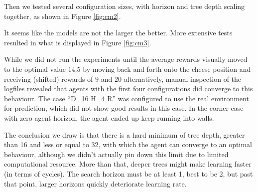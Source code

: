 \documentclass{article}
\begin{document}
\begin{flushleft}
\begin{figure}
\end{figure}

\newpage

Then we tested several configuration sizes, with 
horizon and tree depth scaling together, 
as shown in Figure \ref{fig:cm2}.

\begin{figure}
\end{figure}

It seems like the models are not the larger
the better. More extensive tests resulted
in what is displayed in Figure \ref{fig:cm3}.

While we did not run the experiments until the
average rewards visually moved to the optimal value 
$14.5$ by moving
back and forth onto the cheese position and receiving
(shifted) rewards of $9$ and $20$ alternatively,
manual inspection of the logfiles revealed
that agents with the first four configurations
did converge to this behaviour.
The case “D=16 H=4 R” was configured to use
the real environment for prediction, which did
not show good results in this case.
In the corner case with zero agent horizon,
the agent ended up keep running into walls.

The conclusion we draw is that there is a
hard minimum of tree depth, greater than 16 
and less or equal to 32, with which the
agent can converge to an optimal behaviour,
although we didn't actually pin down this limit
due to limited computational resource.
More than that, deeper trees might make learning faster 
(in terms of cycles). 
The search horizon must be at least 1, 
best to be 2, but past that point, larger horizons quickly
deteriorate learning rate.


\end{flushleft}
\end{document}
